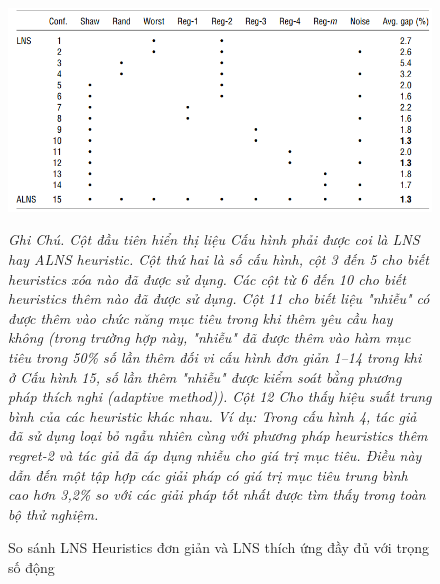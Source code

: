 \begin{center}
    \begin{figure}[]
    \caption{So sánh LNS Heuristics đơn giản và LNS thích ứng đầy đủ với trọng số động}        
    \begin{center}
     \includegraphics[scale=.5]{figures/Thuy_table4}
    \end{center}
  \textit{Ghi Chú. Cột đầu tiên hiển thị liệu Cấu hình phải được coi là LNS hay ALNS heuristic. Cột thứ hai là số cấu hình, cột 3 đến 5 cho biết heuristics xóa nào đã được sử dụng. Các cột từ 6 đến 10 cho biết heuristics thêm nào đã được sử dụng. Cột 11 cho biết liệu "nhiễu" có được thêm vào chức năng mục tiêu trong khi thêm yêu cầu hay không (trong trường hợp này, "nhiễu" đã được thêm vào hàm mục tiêu trong 50\% số lần thêm đối vi cấu hình đơn giản 1–14 trong khi ở Cấu hình 15, số lần thêm "nhiễu" được kiểm soát bằng phương pháp thích nghi (adaptive method)). Cột 12 Cho thấy hiệu suất trung bình của các heuristic khác nhau. Ví dụ: Trong cấu hình 4, tác giả đã sử dụng loại bỏ ngẫu nhiên cùng với phương pháp heuristics thêm regret-2 và tác giả đã áp dụng nhiễu cho giá trị mục tiêu. Điều này dẫn đến một tập hợp các giải pháp có giá trị mục tiêu trung bình cao hơn 3,2\% so với các giải pháp tốt nhất được tìm thấy trong toàn bộ thử nghiệm.}
    \end{figure}
\end{center}

